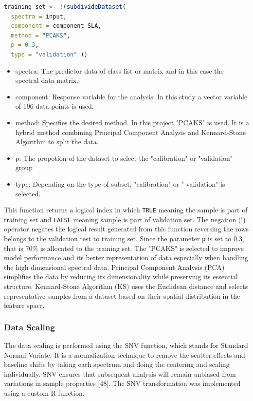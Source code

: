 \documentclass[12pt,a4paper]{report}
\begin{document}
\begin{lstlisting}[language=R, style=mystyle]
training_set <- !(subdivideDataset(
  spectra = input,
  component = component_SLA,
  method = "PCAKS", 
  p = 0.3, 
  type = "validation" ))
\end{lstlisting}


\begin{itemize}
    \item spectra: The predictor data of class list or matrix and in this case the spectral data matrix.
    \item component: Response variable for the analysis. In this study a vector variable of 196 data points is used.
    \item method: Specifies the desired method. In this project "PCAKS" is used. It is a hybrid method combining Principal Component Analysis and Kennard-Stone Algorithm to split the data.
    \item p: The propotion of the dataset to select the "calibration" or "validation" group
    \item type: Depending on the type of subset, "calibration" or " validation" is selected.
\end{itemize}

This function returns a logical index in which \texttt{TRUE} meaning the sample is part of training set and \texttt{FALSE} meaning sample is part of validation set. The negation (!) operator negates the logical result generated from this function reversing the rows belongs to the validation test to training set. Since the parameter \texttt{p} is set to $0.3$, that is $70\%$ is allocated to the training set. The "PCAKS" is selected to improve model performance and its better representation of data especially when handling the high dimensional spectral data. Principal Component Analysis (PCA) simplifies the data by reducing its dimensionality while preserving its essential structure. Kennard-Stone Algorithm (KS) uses the Euclidean distance and selects representative samples from a dataset based on their spatial distribution in the feature space.


\subsubsection*{Data Scaling}
The data scaling is performed using the SNV function, which stands for Standard Normal Variate. It is a normalization technique to remove the scatter effects and baseline shifts by taking each spectrum and doing the centering and scaling individually. SNV ensures that subsequent analysis will remain unbiased from variations in sample properties [48]. The SNV transformation was implemented using a custom R function. \\
\end{document}
